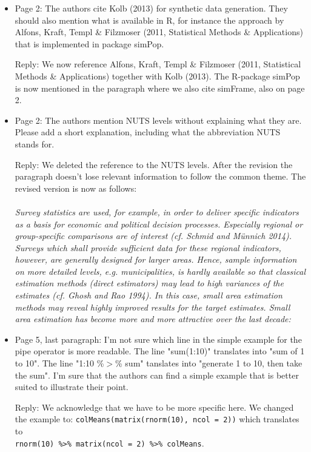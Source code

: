 \documentclass[11pt]{article}
\begin{document}
\begin{itemize}
\item
	Page 2: The authors cite Kolb (2013) for synthetic data generation. They should also mention what is available in R, for instance the approach by Alfons, Kraft, Templ \& Filzmoser (2011, Statistical Methods \& Applications) that is implemented in package simPop.
	
	Reply: We now reference Alfons, Kraft, Templ \& Filzmoser (2011, Statistical Methods \& Applications) together with Kolb (2013). The R-package simPop is now mentioned in the paragraph where we also cite simFrame, also on page 2.

\item
	Page 2: The authors mention NUTS levels without explaining what they are. Please add a short explanation, including what the abbreviation NUTS stands for.
	
	Reply: We deleted the reference to the NUTS levels. After the revision the paragraph doesn't lose relevant information to follow the common theme. The revised version is now as follows:\\\\
	\textit{
	Survey statistics are used, for example, in order to deliver specific indicators as a basis for
economic and political decision processes. Especially regional or group-specific comparisons
are of interest (cf. Schmid and M\"unnich 2014). Surveys which shall provide sufficient data
for these regional indicators, however, are generally designed for larger areas. Hence, sample
information on more detailed levels, e.g. municipalities, is hardly available so that classical
estimation methods (direct estimators) may lead to high variances of the estimates (cf. Ghosh
and Rao 1994). In this case, small area estimation methods may reveal highly improved results
for the target estimates. Small area estimation has become more and more attractive over
the last decade:
	}

\item
	Page 5, last paragraph: I'm not sure which line in the simple example for the pipe operator is more readable. The line "sum(1:10)" translates into "sum of 1 to 10". The line "1:10 \%$>$\% sum" tanslates into "generate 1 to 10, then take the sum". I'm sure that the authors can find a simple example that is better suited to illustrate their point.
	
	Reply: We acknowledge that we have to be more specific here. We changed the example to:
	\verb'colMeans(matrix(rnorm(10), ncol = 2))' which translates to \\\verb'rnorm(10) %>% matrix(ncol = 2) %>% colMeans'.


\end{itemize}
\end{document}

